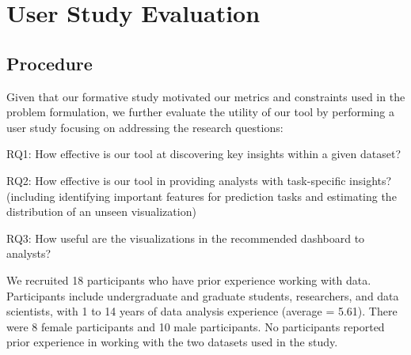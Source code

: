 \section{User Study Evaluation\label{sec:userstudy}}
\subsection{Procedure}
Given that our formative study motivated our metrics and constraints used in the problem formulation, we further evaluate the utility of our tool by performing a user study focusing on addressing the research questions:
\begin{denselist}
	\item RQ1: How effective is our tool at discovering key insights within a given dataset?
	\item RQ2: How effective is our tool in providing analysts with task-specific insights? (including identifying important features for prediction tasks and estimating the distribution of an unseen visualization)
	\item RQ3: How useful are the visualizations in the recommended dashboard to analysts?
\end{denselist}

We recruited 18 participants who have prior experience working with data. Participants include undergraduate and graduate students, researchers, and data scientists, with 1 to 14 years of data analysis experience (average = 5.61).  %
There were 8 female participants and 10 male participants. No participants reported prior experience in working with the two datasets used in the study.

